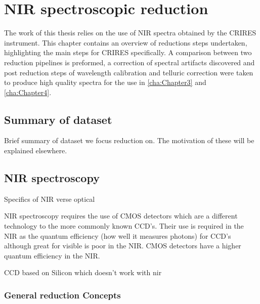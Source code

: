





\chapter{NIR spectroscopic reduction} %
\label{cha:reduction} 

The work of this thesis relies on the use of NIR spectra obtained by the CRIRES instrument. This chapter contains an overview of reductions steps undertaken, highlighting the main steps for CRIRES specifically. A comparison between two reduction pipelines is preformed, a correction of spectral artifacts discovered and post reduction steps of wavelength calibration and telluric correction were taken to produce high quality spectra for the use in \cref{cha:Chapter3} and~ \ref{cha:Chapter4}. 

\section{Summary of dataset}
\todo{}{}
Brief summary of dataset we focus reduction on. The motivation of these will be explained elsewhere.



 
\section{NIR spectroscopy}
\todo{}{}
Specifics of NIR verse optical


NIR spectroscopy requires the use of CMOS detectors which are a different technology to the more commonly known CCD's. Their use is required in the NIR as the quantum efficiency (how well it measures photons) for CCD's although great for visible is poor in the NIR. CMOS detectors have a higher quantum efficiency in the NIR. 

CCD based on Silicon which doesn't work with nir


\subsection{General reduction Concepts}
\label{subsec:nirreduction}

